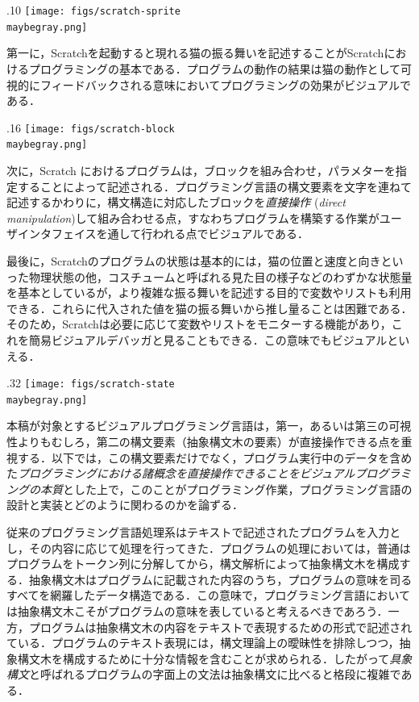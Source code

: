 \documentclass [11pt] {jsarticle}
\newcommand\maybegray{} %
\begin{document}
\begin {floatingfigure}[r]{.10\linewidth}
\texttt{[image: figs/scratch-sprite\\maybegray.png]}
\end {floatingfigure}
第一に，Scratchを起動すると現れる猫の振る舞いを記述することがScratchにおけるプログラミングの基本である．プログラムの動作の結果は猫の動作として可視的にフィードバックされる意味においてプログラミングの効果がビジュアルである．

\begin {floatingfigure}[r]{.16\linewidth}
\texttt{[image: figs/scratch-block\\maybegray.png]}
\end {floatingfigure}
次に，Scratch におけるプログラムは，ブロックを組み合わせ，パラメターを指定することによって記述される．プログラミング言語の構文要素を文字を連ねて記述するかわりに，構文構造に対応したブロックを\emph {直接操作} (\emph {direct manipulation})して組み合わせる点，すなわちプログラムを構築する作業がユーザインタフェイスを通して行われる点でビジュアルである．

最後に，Scratchのプログラムの状態は基本的には，猫の位置と速度と向きといった物理状態の他，コスチュームと呼ばれる見た目の様子などのわずかな状態量を基本としているが，より複雑な振る舞いを記述する目的で変数やリストも利用できる．これらに代入された値を猫の振る舞いから推し量ることは困難である．そのため，Scratchは必要に応じて変数やリストをモニターする機能があり，これを簡易ビジュアルデバッガと見ることもできる．この意味でもビジュアルといえる．
\begin {floatingfigure}[r]{.32\linewidth}
\texttt{[image: figs/scratch-state\\maybegray.png]}
\end {floatingfigure}

本稿が対象とするビジュアルプログラミング言語は，第一，あるいは第三の可視性よりもむしろ，第二の構文要素（抽象構文木の要素）が直接操作できる点を重視する．以下では，この構文要素だけでなく，プログラム実行中のデータを含めた\emph {プログラミングにおける諸概念を直接操作できることをビジュアルプログラミングの本質}とした上で，このことがプログラミング作業，プログラミング言語の設計と実装とどのように関わるのかを論ずる．

従来のプログラミング言語処理系はテキストで記述されたプログラムを入力とし，その内容に応じて処理を行ってきた．プログラムの処理においては，普通はプログラムをトークン列に分解してから，構文解析によって抽象構文木を構成する．抽象構文木はプログラムに記載された内容のうち，プログラムの意味を司るすべてを網羅したデータ構造である．この意味で，プログラミング言語においては抽象構文木こそがプログラムの意味を表していると考えるべきであろう．一方，プログラムは抽象構文木の内容をテキストで表現するための形式で記述されている．プログラムのテキスト表現には，構文理論上の曖昧性を排除しつつ，抽象構文木を構成するために十分な情報を含むことが求められる．したがって\emph {具象構文}と呼ばれるプログラムの字面上の文法は抽象構文に比べると格段に複雑である．
\end{document}
